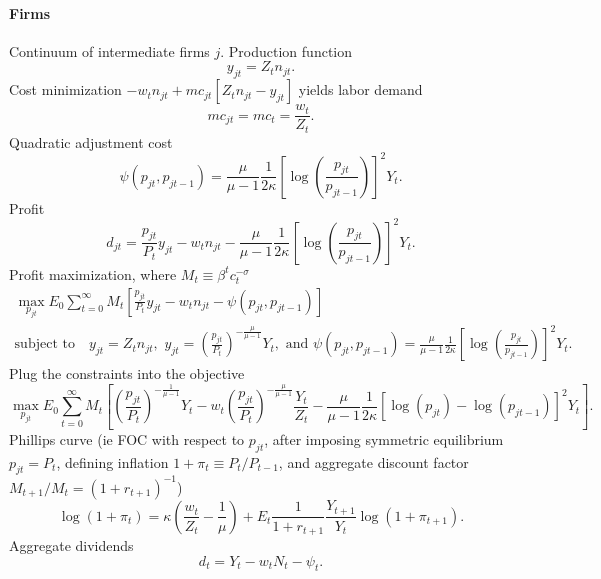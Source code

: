 \documentclass[11pt,a4paper]{article}
\begin{document}
\paragraph{Firms}
Continuum of intermediate firms $j$. Production function
\begin{equation*}
y_{jt}=Z_tn_{jt}.
\end{equation*}
Cost minimization $-w_tn_{jt}+mc_{jt}[Z_tn_{jt}-y_{jt}]$ yields labor demand
\begin{equation*}
mc_{jt}=mc_t=\frac{w_t}{Z_t}.
\end{equation*}
Quadratic adjustment cost
\begin{equation*}
\psi(p_{jt},p_{jt-1})=\frac{\mu}{\mu-1}\frac{1}{2\kappa}\left[\log\left(\frac{p_{jt}}{p_{jt-1}}\right)\right]^2Y_t.
\end{equation*}
Profit
\begin{equation*}
d_{jt}=\frac{p_{jt}}{P_t}y_{jt}-w_tn_{jt}-\frac{\mu}{\mu-1}\frac{1}{2\kappa}\left[\log\left(\frac{p_{jt}}{p_{jt-1}}\right)\right]^2Y_t.
\end{equation*}
Profit maximization, where $M_{t}\equiv\beta^t c_{t}^{-\sigma}$
\begin{equation*}
\begin{gathered}
\max_{p_{jt}}E_0\sum_{t=0}^{\infty}M_{t}\left[\frac{p_{jt}}{P_t}y_{jt}-w_tn_{jt}-\psi(p_{jt},p_{jt-1})\right]\\
\text{subject to}\quad y_{jt}=Z_tn_{jt},\,\, y_{jt}=\left(\frac{p_{jt}}{P_t}\right)^{-\frac{\mu}{\mu-1}}Y_t,\,\,\text{and } \psi(p_{jt},p_{jt-1})=\frac{\mu}{\mu-1}\frac{1}{2\kappa}\left[\log\left(\frac{p_{jt}}{p_{jt-1}}\right)\right]^2Y_t.
\end{gathered}
\end{equation*}
Plug the constraints into the objective
\begin{equation*}
\max_{p_{jt}}E_0\sum_{t=0}^{\infty}M_{t}\left[\left(\frac{p_{jt}}{P_t}\right)^{-\frac{1}{\mu-1}}Y_t-w_t\left(\frac{p_{jt}}{P_t}\right)^{-\frac{\mu}{\mu-1}}\frac{Y_t}{Z_t}-\frac{\mu}{\mu-1}\frac{1}{2\kappa}\left[\log(p_{jt})-\log(p_{jt-1})\right]^2Y_t\right].
\end{equation*}
Phillips curve (ie FOC with respect to $p_{jt}$, after imposing symmetric equilibrium $p_{jt}=P_t$, defining inflation $1+\pi_t\equiv P_{t}/P_{t-1}$, and aggregate discount factor $M_{t+1}/M_t=(1+r_{t+1})^{-1}$)
\begin{equation*}
\log(1+\pi_t)=\kappa\left(\frac{w_t}{Z_t}-\frac{1}{\mu}\right)+E_t\frac{1}{1+r_{t+1}}\frac{Y_{t+1}}{Y_t}\log(1+\pi_{t+1}).
\end{equation*}
Aggregate dividends
\begin{equation*}
d_t=Y_t-w_tN_t-\psi_t.
\end{equation*}
\end{document}

